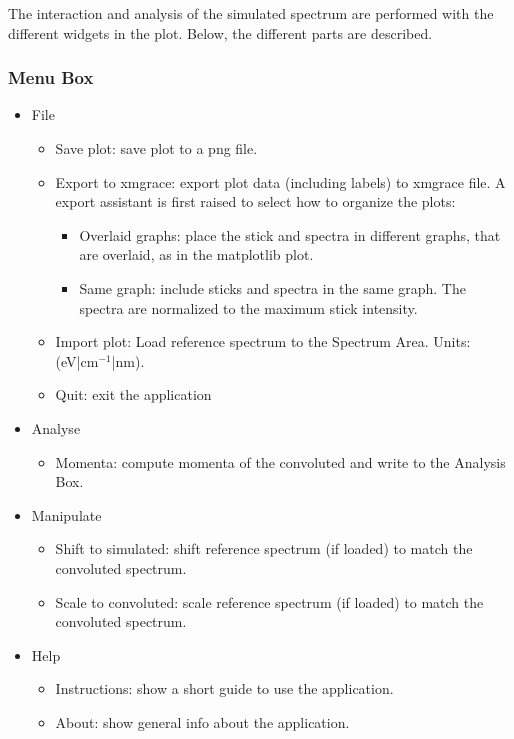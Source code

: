 \documentclass[a4paper,11pt]{article}
\begin{document}
The interaction and analysis of the simulated spectrum are performed with the different widgets in the plot. Below, the different parts are described.

\subsubsection{Menu Box}
\begin{itemize}
 \item File
 \begin{itemize}
  \item Save plot: save plot to a png file.
  \item Export to xmgrace: export plot data (including labels) to xmgrace file. A export assistant is first raised to select how to organize the plots:
  \begin{itemize}
   \item Overlaid graphs: place the stick and spectra in different graphs, that are overlaid, as in the matplotlib plot.
   \item Same graph: include sticks and spectra in the same graph. The spectra are normalized to the maximum stick intensity.
  \end{itemize}

  \item Import plot: Load reference spectrum to the Spectrum Area. Units: (eV|cm$^{-1}$|nm).
  \item Quit: exit the application
 \end{itemize}

 \item Analyse
 \begin{itemize}
  \item Momenta: compute momenta of the convoluted and write to the Analysis Box.
 \end{itemize}

 \item Manipulate
 \begin{itemize}
  \item Shift to simulated: shift reference spectrum (if loaded) to match the convoluted spectrum.
  \item Scale to convoluted: scale reference spectrum (if loaded) to match the convoluted spectrum.
 \end{itemize}

 \item Help
 \begin{itemize}
  \item Instructions: show a short guide to use the application.
  \item About: show general info about the application.
 \end{itemize}
\end{itemize}
 
\end{document}

